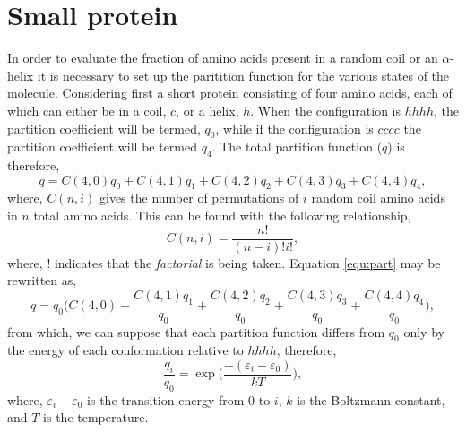 \documentclass[a4paper]{article}
\begin{document}
\section{Small protein}
In order to evaluate the fraction of amino acids present in a random coil or an $\alpha$-helix it is necessary to set up the paritition function for the various states of the molecule. 
Considering first a short protein consisting of four amino acids, each of which can either be in a coil, $c$, or a helix, $h$. 
When the configuration is $hhhh$, the partition coefficient will be termed, $q_0$, while if the configuration is $cccc$ the partition coefficient will be termed $q_4$. 
The total partition function ($q$) is therefore, 
%
\begin{equation}
    q = C(4, 0) q_0 + C(4, 1) q_1 + C(4, 2) q_2 + C(4, 3) q_3 + C(4, 4) q_4,
    \label{equ:part}
\end{equation}
%
where, $C(n, i)$ gives the number of permutations of $i$ random coil amino acids in $n$ total amino acids. 
This can be found with the following relationship,
%
\begin{equation}
    C(n, i) = \frac{n!}{(n-i)!i!}, 
\end{equation}
%
where, $!$ indicates that the \emph{factorial} is being taken. 
Equation \ref{equ:part} may be rewritten as,
%
\begin{equation}
    q = q_0\bigg(C(4, 0) + \frac{C(4, 1) q_1}{q_0} + \frac{C(4, 2) q_2}{q_0} + \frac{C(4, 3) q_3}{q_0} + \frac{C(4, 4) q_4}{q_0}\bigg),
    \label{equ:part1}
\end{equation}
%
from which, we can suppose that each partition function differs from $q_0$ only by the energy of each conformation relative to $hhhh$, therefore, 
%
\begin{equation}
    \frac{q_i}{q_0} = \exp{\bigg(\frac{-(\varepsilon_i - \varepsilon_0)}{kT}\bigg)},
    \label{equ:part2}
\end{equation}
%
where, $\varepsilon_i - \varepsilon_0$ is the transition energy from $0$ to $i$, $k$ is the Boltzmann constant, and $T$ is the temperature.
\end{document}
